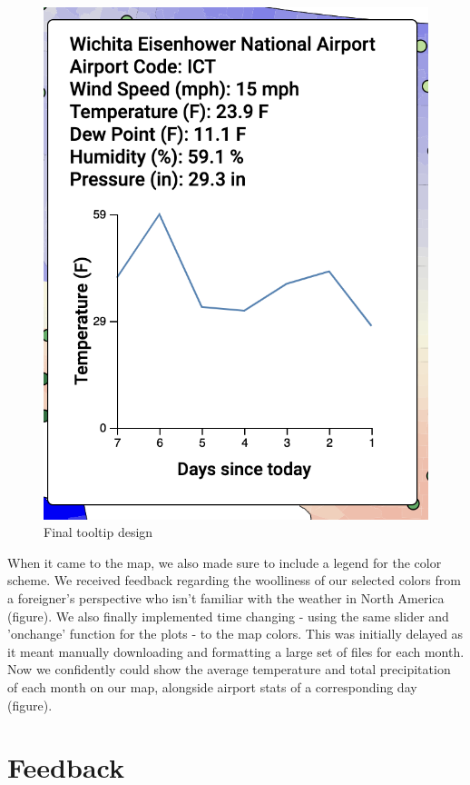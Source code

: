 \documentclass[10pt,twocolumn,twoside]{opticajnl}
\begin{document}
\begin{figure}
    \centering
    \includegraphics[scale=0.5]{images/img9.png}
    \caption{Final tooltip design}
\end{figure}

When it came to the map, we also made sure to include a legend for the color scheme. We received feedback regarding the woolliness of our selected colors from a foreigner's perspective who isn't familiar with the weather in North America (figure). We also finally implemented time changing - using the same slider and 'onchange' function for the plots - to the map colors. This was initially delayed as it meant manually downloading and formatting a large set of files for each month. Now we confidently could show the average temperature and total precipitation of each month on our map, alongside airport stats of a corresponding day (figure).

\section {Feedback}
\end{document}

